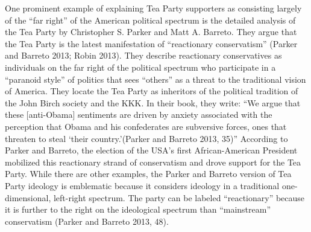 \documentclass[12pt,]{article}
\begin{document}
One prominent example of explaining Tea Party supporters as consisting
largely of the ``far right'' of the American political spectrum is the
detailed analysis of the Tea Party by Christopher S. Parker and Matt A.
Barreto. They argue that the Tea Party is the latest manifestation of
``reactionary conservatism'' (Parker and Barreto 2013; Robin 2013). They
describe reactionary conservatives as individuals on the far right of
the political spectrum who participate in a ``paranoid style'' of
politics that sees ``others'' as a threat to the traditional vision of
America. They locate the Tea Party as inheritors of the political
tradition of the John Birch society and the KKK. In their book, they
write: ``We argue that these {[}anti-Obama{]} sentiments are driven by
anxiety associated with the perception that Obama and his confederates
are subversive forces, ones that threaten to steal `their
country.'(Parker and Barreto 2013, 35)'' According to Parker and
Barreto, the election of the USA's first African-American President
mobilized this reactionary strand of conservatism and drove support for
the Tea Party. While there are other examples, the Parker and Barreto
version of Tea Party ideology is emblematic because it considers
ideology in a traditional one-dimensional, left-right spectrum. The
party can be labeled ``reactionary'' because it is further to the right
on the ideological spectrum than ``mainstream'' conservatism (Parker and
Barreto 2013, 48).
\end{document}
